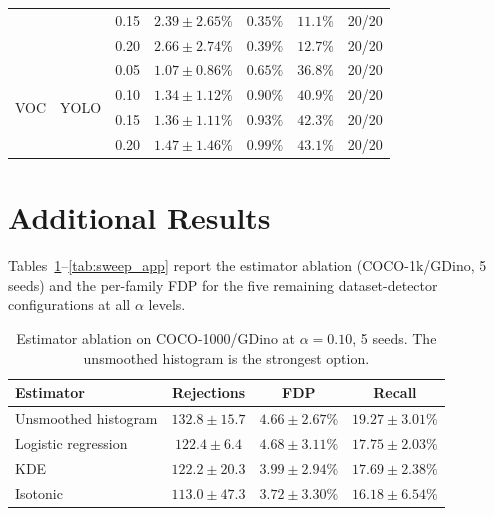 \documentclass{article}
\theoremstyle{remark}
\newcommand{\1}{\mathbf{1}}
\begin{document}
\begin{table}[h]
\begin{tabular*}{\linewidth}{@{\extracolsep{\fill}}llccccc@{}}
 & & 0.15 & $2.39 \pm 2.65\%$ & $0.35\%$ & $11.1\%$ & 20/20 \\
 & & 0.20 & $2.66 \pm 2.74\%$ & $0.39\%$ & $12.7\%$ & 20/20 \\
\midrule
\multirow{4}{*}{VOC} & \multirow{4}{*}{YOLO}
 & 0.05 & $1.07 \pm 0.86\%$ & $0.65\%$ & $36.8\%$ & 20/20 \\
 & & 0.10 & $1.34 \pm 1.12\%$ & $0.90\%$ & $40.9\%$ & 20/20 \\
 & & 0.15 & $1.36 \pm 1.11\%$ & $0.93\%$ & $42.3\%$ & 20/20 \\
 & & 0.20 & $1.47 \pm 1.46\%$ & $0.99\%$ & $43.1\%$ & 20/20 \\
\bottomrule
\end{tabular*}
\end{table}

\section{Additional Results}
\label{app:additional}

Tables~\ref{app:ablation}--\ref{tab:sweep_app} report the estimator ablation
(COCO-1k/GDino, 5 seeds) and the per-family FDP for the five remaining
dataset-detector configurations at all $\alpha$ levels.

\begin{table}[h]
\centering
\small
\begin{tabular}{lccc}
\toprule
Estimator & Rejections & FDP & Recall \\
\midrule
Unsmoothed histogram & $132.8 \pm 15.7$ & $4.66 \pm 2.67\%$ & $19.27 \pm 3.01\%$ \\
Logistic regression & $122.4 \pm 6.4$ & $4.68 \pm 3.11\%$ & $17.75 \pm 2.03\%$ \\
KDE & $122.2 \pm 20.3$ & $3.99 \pm 2.94\%$ & $17.69 \pm 2.38\%$ \\
Isotonic & $113.0 \pm 47.3$ & $3.72 \pm 3.30\%$ & $16.18 \pm 6.54\%$ \\
\bottomrule
\end{tabular}
\caption{Estimator ablation on COCO-1000/GDino at $\alpha=0.10$, 5 seeds.
The unsmoothed histogram is the strongest option.}
\label{app:ablation}
\end{table}
\end{document}
